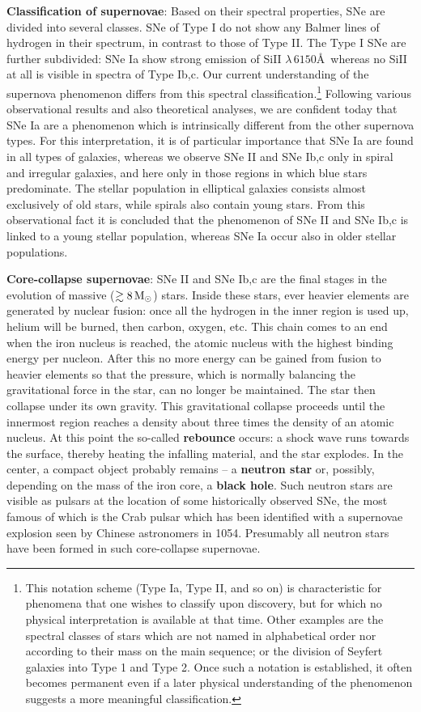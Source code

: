 \documentclass[a4paper,10pt]{article}
\begin{document}
{\noindent}\textbf{Classification of supernovae}: Based on their spectral properties, SNe are divided into several classes. SNe of Type I do not show any Balmer lines of hydrogen in their spectrum, in contrast to those of Type II. The Type I SNe are further subdivided: SNe Ia show strong emission of SiII $\lambda\,6150$\AA~whereas no SiII at all is visible in spectra of Type Ib,c. Our current understanding of the supernova phenomenon differs from this spectral classification.\footnote{This notation scheme (Type Ia, Type II, and so on) is characteristic for phenomena that one wishes to classify upon discovery, but for which no physical interpretation is available at that time. Other examples are the spectral classes of stars which are not named in alphabetical order nor according to their mass on the main sequence; or the division of Seyfert galaxies into Type 1 and Type 2. Once such a notation is established, it often becomes permanent even if a later physical understanding of the phenomenon suggests a more meaningful classification.} Following various observational results and also theoretical analyses, we are confident today that SNe Ia are a phenomenon which is intrinsically different from the other supernova types. For this interpretation, it is of particular importance that SNe Ia are found in all types of galaxies, whereas we observe SNe II and SNe Ib,c only in spiral and irregular galaxies, and here only in those regions in which blue stars predominate. The stellar population in elliptical galaxies consists almost exclusively of old stars, while spirals also contain young stars. From this observational fact it is concluded that the phenomenon of SNe II and SNe Ib,c is linked to a young stellar population, whereas SNe Ia occur also in older stellar populations.

{\noindent}\textbf{Core-collapse supernovae}: SNe II and SNe Ib,c are the final stages in the evolution of massive ($\gtrsim8\,{\rm M}_\odot$) stars. Inside these stars, ever heavier elements are generated by nuclear fusion: once all the hydrogen in the inner region is used up, helium will be burned, then carbon, oxygen, etc. This chain comes to an end when the iron nucleus is reached, the atomic nucleus with the highest binding energy per nucleon. After this no more energy can be gained from fusion to heavier elements so that the pressure, which is normally balancing the gravitational force in the star, can no longer be maintained. The star then collapse under its own gravity. This gravitational collapse proceeds until the innermost region reaches a density about three times the density of an atomic nucleus. At this point the so-called \textbf{rebounce} occurs: a shock wave runs towards the surface, thereby heating the infalling material, and the star explodes. In the center, a compact object probably remains -- a \textbf{neutron star} or, possibly, depending on the mass of the iron core, a \textbf{black hole}. Such neutron stars are visible as pulsars at the location of some historically observed SNe, the most famous of which is the Crab pulsar which has been identified with a supernovae explosion seen by Chinese astronomers in 1054. Presumably all neutron stars have been formed in such core-collapse supernovae.
\end{document}
